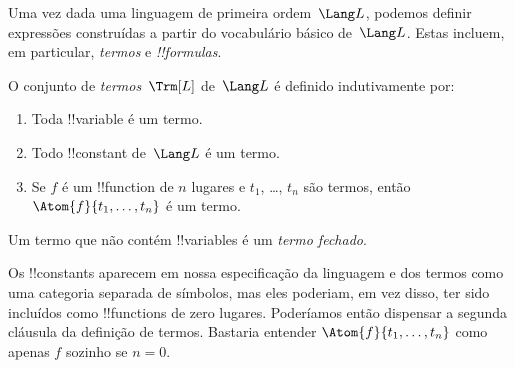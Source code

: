 \documentclass[../../../include/open-logic-section]{subfiles}
\begin{document}


Uma vez dada uma linguagem de primeira ordem~$\Lang L$, podemos definir
expressões construídas a partir do vocabulário básico de~$\Lang L$.  Estas
incluem, em particular, \emph{termos} e \emph{!!{formula}s}.

\begin{defn}[Termos]
O conjunto de \emph{termos}~$\Trm[L]$ de~$\Lang L$ é
definido indutivamente por:
\begin{enumerate}
\item Toda !!{variable} é um termo.
\item Todo !!{constant} de~$\Lang L$ é um termo.
\item Se $f$ é um !!{function} de $n$ lugares e $t_1$, \dots, $t_n$
  são termos, então $\Atom{f}{t_1, \ldots, t_n}$ é um termo.
\end{enumerate}
Um termo que não contém !!{variable}s é um \emph{termo fechado}.
\end{defn}

\begin{explain}
Os !!{constant}s aparecem em nossa especificação da linguagem e dos
termos como uma categoria separada de símbolos, mas eles poderiam, em vez disso, ter
sido incluídos como !!{function}s de zero lugares.  Poderíamos então dispensar
a segunda cláusula da definição de termos. Bastaria
entender $\Atom{f}{t_1, \ldots, t_n}$ como apenas $f$ sozinho se $n =
0$.
\end{explain}
\end{document}
